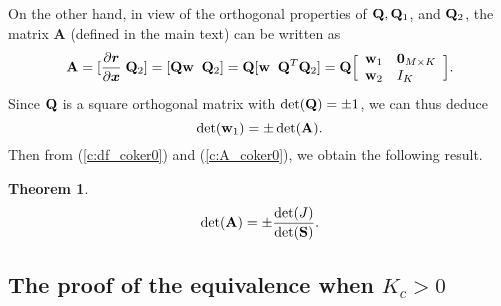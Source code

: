 \documentclass[ amsmath,amssymb,nofootinbib
]{revtex4-1}
\def\mbf#1{\mbox{\boldmath $#1$}}
\newtheorem{theorem}{Theorem}
\newcommand{\be}{\begin{equation}}
\newcommand{\ee}{\end{equation}}
\newcommand{\bQ}{{\bf Q}}
\newcommand{\bS}{{\bf S}}
\newcommand{\bw}{{\bf w}}
\newcommand{\bx}{{\mbf x}}
\newcommand{\br}{{\mbf r}}
\newcommand{\p}{\partial}
\begin{document}
On the other hand, in view of the orthogonal properties of $\bQ, \bQ_1$, and $\bQ_2$,
the matrix {\bf A} (defined in the main text) can be written as
$$
   {\bf A} = [\frac{\p \br}{\p \bx} \; \bQ_2] = [\bQ\bw  \;\;   \bQ_2] = \bQ[\bw \;\; \bQ^T \bQ_2]
       =  \bQ \Big[ \begin{array}{l}
                       \bw_1 \\
                        \bw_2\\
                    \end{array}  \begin{array}{l}
                       {\bf 0}_{M \times K} \\
                        I_{K}\\
                    \end{array}\Big].
$$
Since  $\bQ$ is a square orthogonal matrix with $\det(\bQ) = \pm 1$,
we can thus deduce
\be  \label{c:A_coker0}
             \det({\bf w}_1)  = \pm \det({\bf A}).
\ee
%
Then from (\ref{c:df_coker0}) and (\ref{c:A_coker0}),
we obtain the following result.
\begin{theorem}
\be \label{e:e:main_20_temp10_coker0}
    \det({\bf A}) = \pm \frac{\det( J)}{\det(\bS)}.
\ee
\end{theorem}




\subsection{The proof of the equivalence when $K_c >0$}\label{sec:eq>0}
\end{document}
